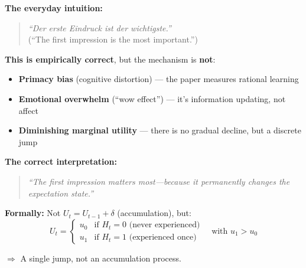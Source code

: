 \begin{tcolorbox}[colback=yellow!5!white, colframe=yellow!75!black,
    title=Intuition Box: Why ``First Impressions Matter'' Is Right---But Not Why You Think]

\textbf{The everyday intuition:}
\begin{quote}
\textit{``Der erste Eindruck ist der wichtigste.''} \\
(``The first impression is the most important.'')
\end{quote}

\textbf{This is empirically correct}, but the mechanism is \textbf{not}:
\begin{itemize}[nosep]
\item[$\times$] \textbf{Primacy bias} (cognitive distortion) --- the paper measures rational learning
\item[$\times$] \textbf{Emotional overwhelm} (``wow effect'') --- it's information updating, not affect
\item[$\times$] \textbf{Diminishing marginal utility} --- there is no gradual decline, but a discrete jump
\end{itemize}

\textbf{The correct interpretation:}
\begin{quote}
\textit{``The first impression matters most---because it permanently changes the expectation state.''}
\end{quote}

\textbf{Formally:} Not $U_t = U_{t-1} + \delta$ (accumulation), but:
\begin{equation}
U_t = \begin{cases}
u_0 & \text{if } H_t = 0 \text{ (never experienced)} \\
u_1 & \text{if } H_t = 1 \text{ (experienced once)}
\end{cases}
\quad \text{with } u_1 > u_0
\end{equation}

$\Rightarrow$ A single jump, not an accumulation process.

\end{tcolorbox}

